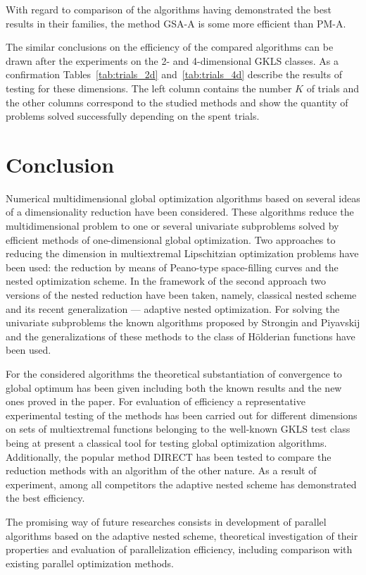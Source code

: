 \documentclass[preprint]{elsarticle}
\begin{document}
With regard to comparison of the algorithms having demonstrated the best results in their families, the method GSA-A is some more efficient than PM-A.

The similar conclusions on the efficiency of the compared algorithms can be drawn after the experiments on the 2- and 4-dimensional GKLS classes. As a confirmation Tables~\ref{tab:trials_2d} and~\ref{tab:trials_4d} describe the results of testing for these dimensions. The left column contains the number $K$ of trials and the other columns correspond to the studied methods and show the quantity of problems solved successfully depending on the spent trials.

\section{Conclusion}
\label{sec:conclusion}
Numerical multidimensional global optimization algorithms based on several ideas of a dimensionality reduction have been considered. These algorithms reduce the multidimensional problem to one or several univariate subproblems solved by efficient methods of one-dimensional global optimization. Two approaches to reducing the dimension in multiextremal Lipschitzian optimization problems have been used: the reduction by means of Peano-type space-filling curves and the nested optimization scheme. In the framework of the second approach two versions of the nested reduction have been taken, namely, classical nested scheme and its recent generalization --- adaptive nested optimization. For solving the univariate subproblems the known algorithms proposed by Strongin and Piyavskij and the generalizations of these methods to the class of H\"olderian functions have been used.

For the considered algorithms the theoretical substantiation of convergence to global optimum has been given including both the known results and the new ones proved in the paper. For evaluation of efficiency a representative experimental testing of the methods has been carried out for different dimensions on sets of multiextremal functions belonging to the well-known GKLS test class being at present a classical tool for testing global optimization algorithms. Additionally, the popular method DIRECT has been tested to compare the reduction methods with an algorithm of the other nature. As a result of experiment, among all competitors the adaptive nested scheme has demonstrated the best efficiency.

The promising way of future researches consists in development of parallel algorithms based on the adaptive nested scheme, theoretical investigation of their properties and evaluation of parallelization efficiency, including comparison with existing parallel optimization methods.
\end{document}

